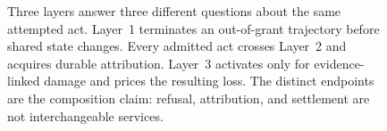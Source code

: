 \begin{figure}[H]
{%
}
\caption{Three layers answer three different questions about the same attempted act. Layer~1 terminates an out-of-grant trajectory before shared state changes. Every admitted act crosses Layer~2 and acquires durable attribution. Layer~3 activates only for evidence-linked damage and prices the resulting loss. The distinct endpoints are the composition claim: refusal, attribution, and settlement are not interchangeable services.}
\label{fig:bonded-three-layer}
\end{figure}
